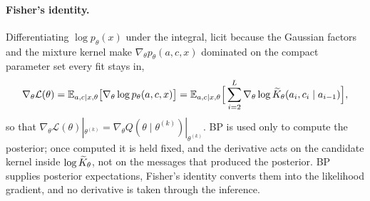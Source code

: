 \paragraph{Fisher's identity.} Differentiating $\log p_\theta(x)$ under the
integral, licit because the Gaussian factors and the mixture kernel make
$\nabla_\theta p_\theta(a,c,x)$ dominated on the compact parameter set every
fit stays in,
\begin{equation}
  \nabla_\theta\mathcal L(\theta)
  = \mathbb{E}_{a,c\mid x,\theta}\big[\nabla_\theta\log p_\theta(a,c,x)\big]
  = \mathbb{E}_{a,c\mid x,\theta}\Big[\sum_{i=2}^{L}\nabla_\theta\log
      \widetilde{K}_\theta(a_i,c_i\mid a_{i-1})\Big],
  \label{eq:em-fisher}
\end{equation}
so that $\nabla_\theta\mathcal L(\theta)|_{\theta^{(k)}} = \nabla_\theta
Q(\theta\mid\theta^{(k)})|_{\theta^{(k)}}$.
BP is used only to compute the posterior; once computed it is held fixed, and
the derivative acts on the candidate kernel inside $\log\widetilde{K}_\theta$,
not on the messages that produced the posterior. BP supplies posterior
expectations, Fisher's identity converts them into the likelihood gradient,
and no derivative is taken through the inference.

